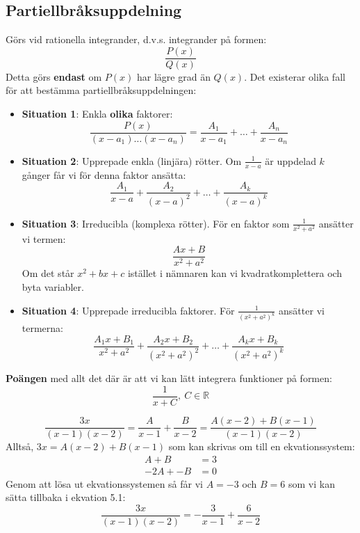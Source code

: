 \documentclass{report}
\begin{document}
\subsection{Partiellbråksuppdelning}
{
Görs vid rationella integrander, d.v.s. integrander på formen:
\begin{equation*}
\frac{P(x)}{Q(x)} 
\end{equation*}
Detta görs \textbf{endast} om $ P(x) $ har lägre grad än $ Q(x) $. Det existerar olika fall för att bestämma partiellbråksuppdelningen:
\begin{itemize}
	\item \textbf{Situation 1}: Enkla \textbf{olika} faktorer:
	\begin{equation*}
		\frac{P(x)}{(x-a_1) \ldots (x-a_n)}  = \frac{A_1}{x-a_1} + \ldots + \frac{A_n}{x-a_n} 
	\end{equation*}
	\item \textbf{Situation 2}: Upprepade enkla (linjära) rötter. Om $ \frac{1}{x-a} $ är uppdelad $ k $ gånger får vi för denna faktor ansätta:
	\begin{equation*}
		\frac{A_1}{x-a} + \frac{A_2}{(x-a)^2} + \ldots + \frac{A_k}{(x-a)^k} 
	\end{equation*}
	\item \textbf{Situation 3}: Irreducibla (komplexa rötter). För en faktor som $ \frac{1}{x^2+a^2}  $ ansätter vi termen:
	\begin{equation*}
		\frac{Ax+B}{x^2+a^2}
	\end{equation*}
	Om det står $ x^2+bx+c $ istället i nämnaren kan vi kvadratkomplettera och byta variabler.
	\item \textbf{Situation 4}: Upprepade irreducibla faktorer. För $ \frac{1}{(x^2+a^2)^k}  $ ansätter vi termerna:
	\begin{equation*}
		\frac{A_1x+B_1}{x^2+a^2} + \frac{A_2x+B_2}{(x^2+a^2)^2} + \ldots + \frac{A_kx+B_k}{(x^2+a^2)^k}  
	\end{equation*}
	
\end{itemize}
\textbf{Poängen} med allt det där är att vi kan lätt integrera funktioner på formen:
\begin{equation*}
\frac{1}{x+C},\: C \in \mathbb{R}
\end{equation*}

}

\ex{}
{
\begin{equation}
\frac{3x}{(x-1)(x-2)} = \frac{A}{x-1} + \frac{B}{x-2} = \frac{A(x-2)+B(x-1)}{(x-1)(x-2)}  
\end{equation}
Alltså, $ 3x = A(x-2)+B(x-1) $   som kan skrivas om till en ekvationssystem:
\begin{align*}
	A+B &= 3\\
	-2A+-B &= 0
\end{align*}
Genom att lösa ut ekvationssystemen så får vi $ A = -3 $ och $ B = 6 $ som vi kan sätta tillbaka i ekvation 5.1:
\begin{equation*}
\frac{3x}{(x-1)(x-2)} = - \frac{3}{x-1} + \frac{6}{x-2}  
\end{equation*}
}
\end{document}
